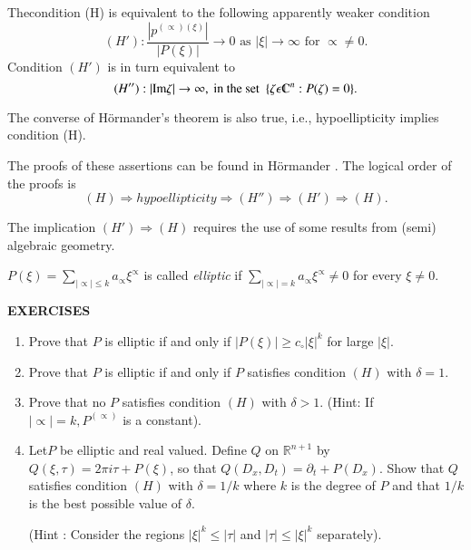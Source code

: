 \setcounter{rem}{29}
\begin{rem} \label{chap3:sec2:rem3.30}%
  The\pageoriginale condition (H) is equivalent to the following apparently weaker condition 
  $$
  (H'): \frac{|p^{(\propto)(\xi)}|}{|P(\xi)|} \to 0\text{ as } |\xi |
  \to \infty \text{ for } \propto \neq 0. 
  $$
  Condition $(H')$ is in turn equivalent to 
  $$
  (H'') : |\text{Im} \zeta| \to \infty, \text{ in the set }~\{ \zeta \epsilon
  \varmathbb{C}^n : P(\zeta) = 0\}.  
  $$
\end{rem}
	
The converse of H\"{o}rmander's theorem is also true,
i.e., hypoellipticity implies condition (H).  
	
The proofs of these assertions can be found in H\"{o}rmander \cite{6}. The
logical order of the proofs is  
$$
(H) \Rightarrow hypoellipticity \Rightarrow ({H''})\Rightarrow ({H'})
\Rightarrow(H). 
$$
	
The implication $(H')\Rightarrow (H)$ requires the use of some results
from (semi) algebraic geometry.  

\setcounter{defi}{30}
\begin{defi} \label{chap3:sec2:def3.31}%
$P(\xi)= \sum\limits_{|\propto|\leq k} a_\propto \xi^\propto$ is called
  \textit{ elliptic } if $\sum\limits_{|\propto|= k} a_\propto
  \xi^\propto \neq 0$  for every $\xi \neq 0$. 
\end{defi}

\textbf{EXERCISES}
\begin{enumerate}
\item Prove that $P$ is elliptic if and only if $|P(\xi)|\geq c_\circ
  |\xi|^k$ for large $|\xi|$.  
\item Prove that $P$ is elliptic if and only if $P$ satisfies
  condition $(H) $ with $\delta =1$.  
\item Prove that no $P$ satisfies condition $(H)$ with $\delta >
  1$. (Hint: If $|\propto|= k, P^{(\propto)}$ is a constant).  
\item Let\pageoriginale $P$ be elliptic and real valued. Define $ Q$ on
  $\mathbb{R}^{n+1}$ by $Q(\xi, \tau)=2 \pi i \tau +P(\xi)$, so that $
  Q(D_x, D_t) = \partial_t + P(D_x)$. Show that $ Q$ satisfies
  condition $(H)$ with $\delta = 1/k$ where $k$ is the degree of $P$
  and that $1/k$ is the best possible value of $\delta$. 

  (Hint : Consider the regions $| \xi |^k \le |\tau |$ and $|\tau| \le
|\xi|^k$ separately). 
\end{enumerate}
